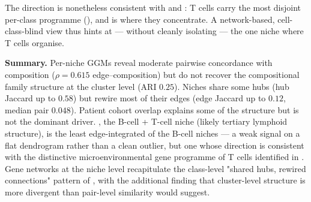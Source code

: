 The direction is nonetheless consistent with  and : T cells carry the most disjoint per-class programme (), and  is where they concentrate. A network-based, cell-class-blind view thus hints at --- without cleanly isolating --- the one niche where T cells organise.

\medskip

\noindent\textbf{Summary.} Per-niche GGMs reveal moderate pairwise concordance with composition ($\rho = 0.615$ edge--composition) but do not recover the compositional family structure at the cluster level (ARI $0.25$). Niches share some hubs (hub Jaccard up to $0.58$) but rewire most of their edges (edge Jaccard up to $0.12$, median pair $0.048$). Patient cohort overlap explains some of the structure but is not the dominant driver. , the B-cell + T-cell niche (likely tertiary lymphoid structure), is the least edge-integrated of the B-cell niches --- a weak signal on a flat dendrogram rather than a clean outlier, but one whose direction is consistent with the distinctive microenvironmental gene programme of T cells identified in . Gene networks at the niche level recapitulate the class-level "shared hubs, rewired connections" pattern of , with the additional finding that cluster-level structure is more divergent than pair-level similarity would suggest.